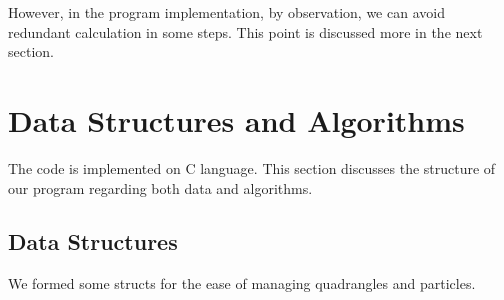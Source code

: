 \documentclass[12pt,oneside,a4paper]{article}
\begin{document}
However, in the program implementation, by observation, we can avoid redundant calculation in some steps. This point is discussed more in the next section.
\section{Data Structures and Algorithms}
The code is implemented on C language. This section discusses the structure of our program regarding both data and algorithms.
\label{sec:algorithm}
\subsection{Data Structures}

We formed some structs for the ease of managing quadrangles and particles.

\begin{table}[h]
\centering
\caption{Struct \textbf{vector} - common 2D Vector}
\label{tab:struct_vector}
\end{table}

\begin{table}[h]
\centering
\caption{Struct \textbf{particle} - coordinations and mass of a particle}
\label{tab:struct_particle}
\end{table}
\end{document}

